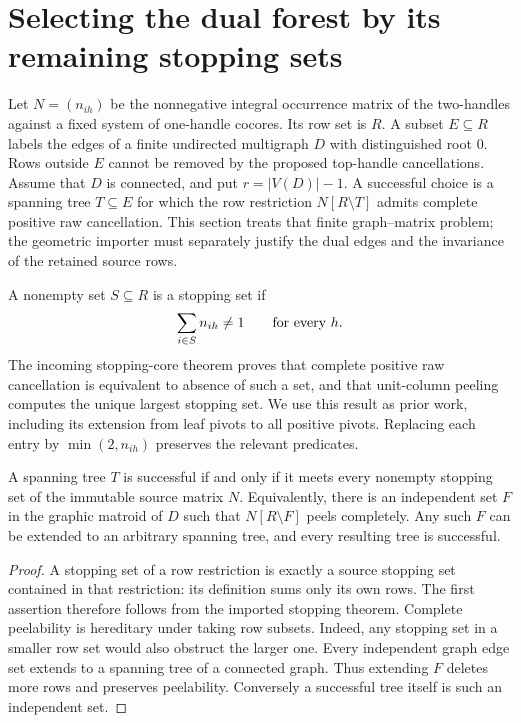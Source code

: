 \section{Selecting the dual forest by its remaining stopping sets}
\label{sec:forest-choice}

Let $N=(n_{ih})$ be the nonnegative integral occurrence matrix of the
two-handles against a fixed system of one-handle cocores.  Its row set is
$R$.  A subset $E\subseteq R$ labels the edges of a finite undirected
multigraph $D$ with distinguished root $0$.  Rows outside $E$ cannot be
removed by the proposed top-handle cancellations.  Assume that $D$ is
connected, and put $r=|V(D)|-1$.  A successful choice is a spanning tree
$T\subseteq E$ for which the row restriction $N[R\setminus T]$ admits
complete positive raw cancellation.  This section treats that finite
graph--matrix problem; the geometric importer must separately justify the
dual edges and the invariance of the retained source rows.

A nonempty set $S\subseteq R$ is a stopping set if
\[
                 \sum_{i\in S}n_{ih}\ne1\qquad\hbox{for every }h.
\]
The incoming stopping-core theorem proves that complete positive raw
cancellation is equivalent to absence of such a set, and that unit-column
peeling computes the unique largest stopping set.  We use this result as
prior work, including its extension from leaf pivots to all positive pivots.
Replacing each entry by $\min(2,n_{ih})$ preserves the relevant predicates.

\begin{theorem}
\label{thm:forest-stopping-transversal}
A spanning tree $T$ is successful if and only if it meets every nonempty
stopping set of the immutable source matrix $N$.  Equivalently, there is
an independent set $F$ in the graphic matroid of $D$ such that
$N[R\setminus F]$ peels completely.  Any such $F$ can be extended to an
arbitrary spanning tree, and every resulting tree is successful.
\end{theorem}
\begin{proof}
A stopping set of a row restriction is exactly a source stopping set
contained in that restriction: its definition sums only its own rows.
The first assertion therefore follows from the imported stopping theorem.
Complete peelability is hereditary under taking row subsets.  Indeed,
any stopping set in a smaller row set would also obstruct the larger
one.  Every independent graph edge set extends to a spanning tree of a
connected graph.  Thus extending $F$ deletes more rows and preserves
peelability.  Conversely a successful tree itself is such an independent
set.
\end{proof}

